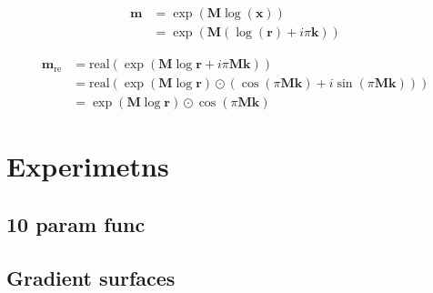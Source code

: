 \documentclass[9pt]{article}
\newcommand{\real}{\text{real}}
\begin{document}
\begin{align}
  \bm m &= \exp(\bm M \log(\bm x)) \\
    &= \exp(\bm M ( \log(\bm r) + i\pi\bm k ))
\end{align}

\begin{align}
  \bm m_{\text{re}} &= \real(\exp(\bm M \log \bm r + i\pi\bm M\bm k)) \\
    &= \real(\exp(\bm M \log \bm r) \odot (\cos(\pi \bm M \bm k) + i \sin(\pi \bm M \bm k))) \\
    &= \exp(\bm M \log \bm r) \odot \cos(\pi \bm M \bm k)
\end{align}

\section{Experimetns}%
\label{sec:experimetns}

\subsection{10 param func}%
\label{sub:10_param_func}


% 
% 


\subsection{Gradient surfaces}%
\label{sub:gradient_surfaces}





\end{document}

